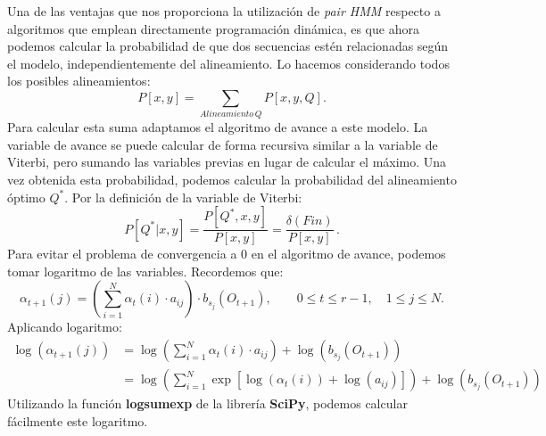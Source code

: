 Una de las ventajas que nos proporciona la utilización de \textit{pair HMM} respecto a algoritmos que emplean directamente programación dinámica, es que ahora podemos calcular la probabilidad de que dos secuencias estén relacionadas según el modelo, independientemente del alineamiento. Lo hacemos considerando todos los posibles alineamientos:
\[P[x,y]=\sum_{Alineamiento\, Q}P[x,y,Q].\]
Para calcular esta suma adaptamos el algoritmo de avance a este modelo. La variable de avance se puede calcular de forma recursiva similar a la variable de Viterbi, pero sumando las variables previas en lugar de calcular el máximo. Una vez obtenida esta probabilidad, podemos calcular la probabilidad del alineamiento óptimo $Q^*$. Por la definición de la variable de Viterbi:
\[P[Q^*|x,y]=\dfrac{P[Q^*, x,y]}{P[x,y]}=\dfrac{\delta(Fin)}{P[x,y]}\,.\]
Para evitar el problema de convergencia a $0$ en el algoritmo de avance, podemos tomar logaritmo de las variables. Recordemos que:
\begin{equation*}
        \alpha_{t+1}(j)=\left(\sum_{i=1}^N\alpha_{t}(i)\cdot a_{ij}\right)\cdot b_{s_j}(O_{t+1}), \qquad 0\leq t\leq r-1 , \quad 1\leq j\leq N.
\end{equation*}
Aplicando logaritmo:
\begin{align*}
    \log(\alpha_{t+1}(j)) &= \log\left(\sum_{i=1}^N\alpha_{t}(i)\cdot a_{ij}\right) + \log(b_{s_j}(O_{t+1})) \\
        &=\log\left(\sum_{i=1}^N\exp\left[\log(\alpha_{t}(i))+\log(a_{ij})\right]\right) + \log(b_{s_j}(O_{t+1}))
\end{align*}
Utilizando la función \textbf{logsumexp} de la librería \textbf{SciPy}\cite{scipy}, podemos calcular fácilmente este logaritmo.

